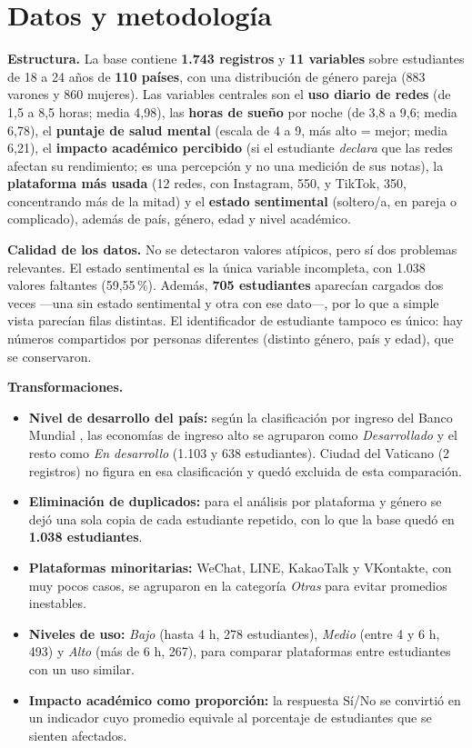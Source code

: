 \section{Datos y metodología}

\textbf{Estructura.} La base contiene \textbf{1.743 registros} y \textbf{11 variables} sobre estudiantes de
18 a 24 años de \textbf{110 países}, con una distribución de género pareja (883 varones y 860 mujeres). Las
variables centrales son el \textbf{uso diario de redes} (de 1,5 a 8,5 horas; media 4,98), las \textbf{horas
de sueño} por noche (de 3,8 a 9,6; media 6,78), el \textbf{puntaje de salud mental} (escala de 4 a 9, más
alto = mejor; media 6,21), el \textbf{impacto académico percibido} (si el estudiante \emph{declara} que las
redes afectan su rendimiento; es una percepción y no una medición de sus notas), la \textbf{plataforma más
usada} (12 redes, con Instagram, 550, y TikTok, 350, concentrando más de la mitad) y el \textbf{estado
sentimental} (soltero/a, en pareja o complicado), además de país, género, edad y nivel académico.

\textbf{Calidad de los datos.} No se detectaron valores atípicos, pero sí dos problemas relevantes. El
estado sentimental es la única variable incompleta, con 1.038 valores faltantes (59,55\,\%). Además,
\textbf{705 estudiantes} aparecían cargados dos veces —una sin estado sentimental y otra con ese dato—,
por lo que a simple vista parecían filas distintas. El identificador de estudiante tampoco es único: hay
números compartidos por personas diferentes (distinto género, país y edad), que se conservaron.

\textbf{Transformaciones.}
\begin{itemize}
  \item \textbf{Nivel de desarrollo del país:} según la clasificación por ingreso del Banco Mundial
  \cite{bancomundial}, las economías de ingreso alto se agruparon como \emph{Desarrollado} y el resto como
  \emph{En desarrollo} (1.103 y 638 estudiantes). Ciudad del Vaticano (2 registros) no figura en esa
  clasificación y quedó excluida de esta comparación.
  \item \textbf{Eliminación de duplicados:} para el análisis por plataforma y género se dejó una sola copia
  de cada estudiante repetido, con lo que la base quedó en \textbf{1.038 estudiantes}.
  \item \textbf{Plataformas minoritarias:} WeChat, LINE, KakaoTalk y VKontakte, con muy pocos casos, se
  agruparon en la categoría \emph{Otras} para evitar promedios inestables.
  \item \textbf{Niveles de uso:} \emph{Bajo} (hasta 4 h, 278 estudiantes), \emph{Medio} (entre 4 y 6 h,
  493) y \emph{Alto} (más de 6 h, 267), para comparar plataformas entre estudiantes con un uso similar.
  \item \textbf{Impacto académico como proporción:} la respuesta Sí/No se convirtió en un indicador cuyo
  promedio equivale al porcentaje de estudiantes que se sienten afectados.
\end{itemize}

